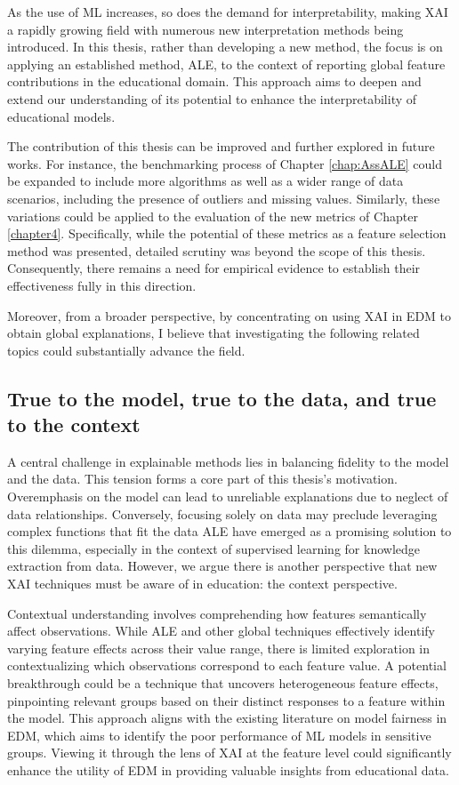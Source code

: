 As the use of \gls{ML} increases, so does the demand for interpretability, making \gls{XAI} a rapidly growing field with numerous new interpretation methods being introduced. In this thesis, rather than developing a new method, the focus is on applying an established method, \gls{ALE}, to the context of reporting global feature contributions in the educational domain. This approach aims to deepen and extend our understanding of its potential to enhance the interpretability of educational models.

The contribution of this thesis can be improved and further explored in future works. For instance, the benchmarking process of Chapter \ref{chap:AssALE} could be expanded to include more algorithms as well as a wider range of data scenarios, including the presence of outliers and missing values. Similarly, these variations could be applied to the evaluation of the new metrics of Chapter \ref{chapter4}. Specifically, while the potential of these metrics as a feature selection method was presented, detailed scrutiny was beyond the scope of this thesis. Consequently, there remains a need for empirical evidence to establish their effectiveness fully in this direction.

Moreover, from a broader perspective, by concentrating on using \gls{XAI} in \gls{EDM} to obtain global explanations, I believe that investigating the following related topics could substantially advance the field. 

\subsection{True to the model, true to the data, and true to the context}

A central challenge in explainable methods lies in balancing fidelity to the model and the data. This tension forms a core part of this thesis's motivation. Overemphasis on the model can lead to unreliable explanations due to neglect of data relationships. Conversely, focusing solely on data may preclude leveraging complex functions that fit the data \gls{ALE} have emerged as a promising solution to this dilemma, especially in the context of supervised learning for knowledge extraction from data. However, we argue there is another perspective that new \gls{XAI} techniques must be aware of in education: the context perspective.

Contextual understanding involves comprehending how features semantically affect observations. While \gls{ALE} and other global techniques effectively identify varying feature effects across their value range, there is limited exploration in contextualizing which observations correspond to each feature value. A potential breakthrough could be a technique that uncovers heterogeneous feature effects, pinpointing relevant groups based on their distinct responses to a feature within the model. This approach aligns with the existing literature on model fairness in \gls{EDM}, which aims to identify the poor performance of \gls{ML} models in sensitive groups. Viewing it through the lens of \gls{XAI} at the feature level could significantly enhance the utility of \gls{EDM} in providing valuable insights from educational data.

